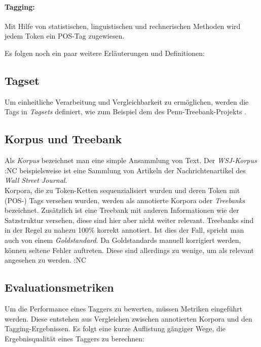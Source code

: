 \paragraph{Tagging:} Mit Hilfe von statistischen, linguistischen und rechnerischen Methoden wird jedem Token ein POS-Tag zugewiesen. 

Es folgen noch ein paar weitere Erläuterungen und Definitionen:

\subsection{Tagset}
\label{sec:intro:pos:tagset}

Um einheitliche Verarbeitung und Vergleichbarkeit zu ermöglichen, werden die Tags in \textit{Tagsets} definiert, wie zum Beispiel dem des Penn-Treebank-Projekts \linebreak \cite{Web:PennBank} \cite{Paper:PennBank}.

\subsection{Korpus und Treebank}
\label{sec:intro:pos:corpus}

Als \textit{Korpus} bezeichnet man eine simple Ansammlung von Text. Der \textit{WSJ-Korpus}  :NC beispielsweise ist eine Sammlung von Artikeln der Nachrichtenartikel des \textit{Wall Street Journal}.
\\
Korpora, die zu Token-Ketten sequenzialisiert wurden und deren Token mit (POS-) Tags versehen wurden, werden als annotierte Korpora oder \textit{Treebanks} bezeichnet. Zusätzlich ist eine Treebank mit anderen Informationen wie der Satzstruktur versehen, diese sind hier aber nicht weiter relevant. Treebanks sind in der Regel zu nahezu 100\% korrekt annotiert. Ist dies der Fall, spricht man auch von einem \textit{Goldstandard}. Da Goldstandards manuell korrigiert werden, können seltene Fehler auftreten. Diese sind allerdings zu wenige, um als relevant angesehen zu werden. :NC

\subsection{Evaluationsmetriken}
\label{sec:intro:pos:metrics}

Um die Performance eines Taggers zu bewerten, müssen Metriken eingeführt werden. Diese entstehen aus Vergleichen zwischen annotierten Korpora und den Tagging-Ergebnissen. Es folgt eine kurze Auflistung gängiger Wege, die Ergebnisqualität eines Taggers zu berechnen:

